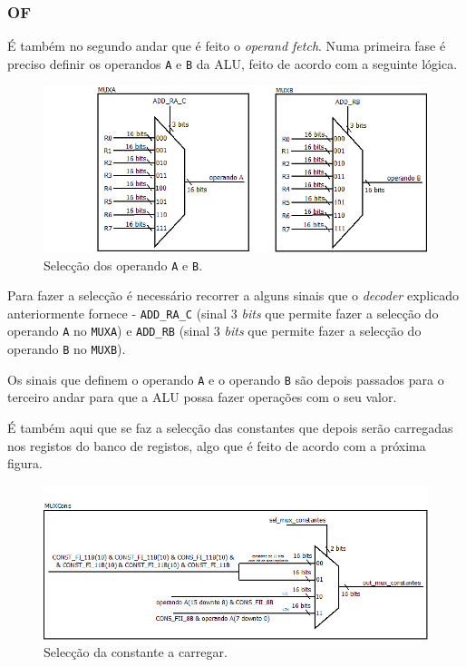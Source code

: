 \documentclass[11pt]{article}
\numberwithin{equation}{section}
\begin{document}
\subsubsection{OF}

É também no segundo andar que é feito o \textit{operand fetch}. Numa primeira fase é preciso definir os operandos \texttt{A} e \texttt{B} da ALU, feito de acordo com a seguinte lógica.

\begin{figure}[H]
	\centering
	\includegraphics[keepaspectratio=true, scale=0.35]{imagens/OF1}
	\caption{Selecção dos operando \texttt{A} e \texttt{B}.}
	\vspace{-0.8em}
\end{figure}

Para fazer a selecção é necessário recorrer a alguns sinais que o \textit{decoder} explicado anteriormente fornece - \texttt{ADD\_RA\_C} (sinal 3 \textit{bits} que permite fazer a selecção do operando \texttt{A} no \texttt{MUXA}) e \texttt{ADD\_RB} (sinal 3 \textit{bits} que permite fazer a selecção do operando \texttt{B} no \texttt{MUXB}). 

Os sinais que definem o operando \texttt{A} e o operando \texttt{B} são depois passados para o terceiro andar para que a ALU possa fazer operações com o seu valor.

É também aqui que se faz a selecção das constantes que depois serão carregadas nos registos do banco de registos, algo que é feito de acordo com a próxima figura.

\vspace{-2.1mm}

\begin{figure}[H]
	\centering
	\includegraphics[keepaspectratio=true, scale=0.40]{imagens/OF2}
	\caption{Selecção da constante a carregar.}
	\vspace{-0.8em}
\end{figure}
\end{document}
